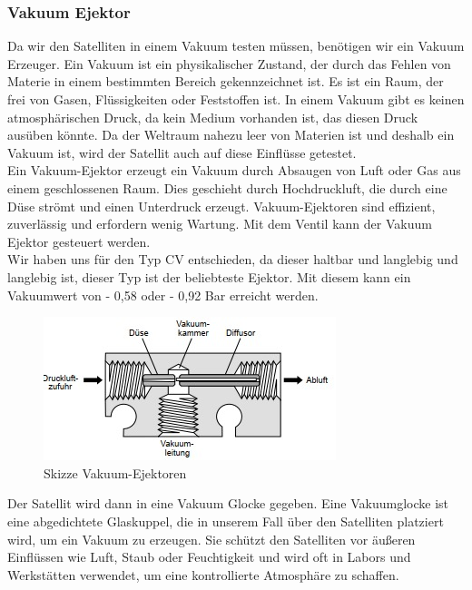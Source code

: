 \subsubsection{Vakuum Ejektor}
Da wir den Satelliten in einem Vakuum testen müssen, benötigen wir ein Vakuum Erzeuger. Ein Vakuum ist ein physikalischer Zustand, der durch das Fehlen von Materie in einem bestimmten Bereich gekennzeichnet ist. Es ist ein Raum, der frei von Gasen, Flüssigkeiten oder Feststoffen ist. In einem Vakuum gibt es keinen atmosphärischen Druck, da kein Medium vorhanden ist, das diesen Druck ausüben könnte. Da der Weltraum nahezu leer von Materien ist und deshalb ein Vakuum ist, wird der Satellit auch auf diese Einflüsse getestet.\\
\vspace{3mm}
Ein Vakuum-Ejektor\autocite{VakuumEjektor} erzeugt ein Vakuum durch Absaugen von Luft oder Gas aus einem geschlossenen Raum. Dies geschieht durch Hochdruckluft, die durch eine Düse strömt und einen Unterdruck erzeugt. Vakuum-Ejektoren sind effizient, zuverlässig und erfordern wenig Wartung. Mit dem Ventil kann der Vakuum Ejektor gesteuert werden.\\
\newpage
Wir haben uns für den Typ CV\autocite{VakuumEjektor} entschieden, da dieser haltbar und langlebig und langlebig ist, dieser Typ ist der beliebteste Ejektor.
Mit diesem kann ein Vakuumwert von - 0,58 oder  - 0,92 Bar erreicht werden.
\vspace{3mm}
\begin{figure}[H]
    \centering
    \includegraphics[scale=1.2]{image/vakuumejektor.jpeg}
    \caption{Skizze Vakuum-Ejektoren\autocite{VakuumEjektor}}
    \label{fig:enter-label}
\end{figure}
\vspace{3mm}
Der Satellit wird dann in eine Vakuum Glocke gegeben. Eine Vakuumglocke ist eine abgedichtete Glaskuppel, die in unserem Fall über den Satelliten platziert wird, um ein Vakuum zu erzeugen. Sie schützt den Satelliten vor äußeren Einflüssen wie Luft, Staub oder Feuchtigkeit und wird oft in Labors und Werkstätten verwendet, um eine kontrollierte Atmosphäre zu schaffen.


